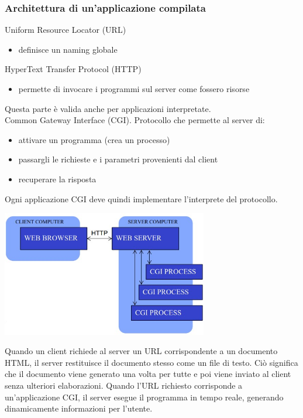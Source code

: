 \subsubsection{Architettura di un'applicazione compilata}
Uniform Resource Locator (URL)
\begin{itemize}
    \item definisce un naming globale
\end{itemize}
HyperText Transfer Protocol (HTTP)
\begin{itemize}
    \item permette di invocare i programmi sul server come fossero risorse
\end{itemize}
Questa parte è valida anche per applicazioni interpretate.
\\Common Gateway Interface (CGI). Protocollo che permette al server di:
\begin{itemize}
    \item attivare un programma (crea un processo)
    \item passargli le richieste e i parametri provenienti dal client 
    \item recuperare la risposta
\end{itemize}
Ogni applicazione CGI deve quindi implementare l'interprete del protocollo.
\begin{center}
    \includegraphics[width=0.675\textwidth]{img/appWeb3.jpg}
\end{center}
Quando un client richiede al server un URL corrispondente a un documento HTML, il server restituisce il documento stesso come un file di testo. Ciò significa che il documento viene generato una volta per tutte e poi viene inviato al client senza ulteriori elaborazioni. Quando l'URL richiesto corrisponde a un'applicazione CGI, il server esegue il programma in tempo reale, generando dinamicamente informazioni per l'utente. 

